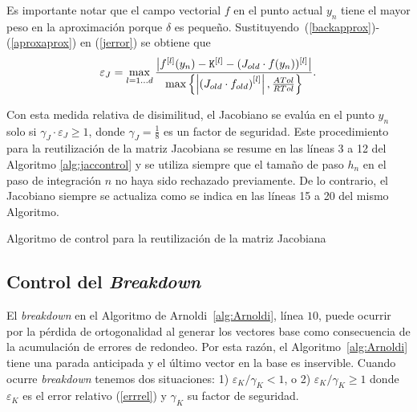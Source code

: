 Es importante notar que el campo vectorial $f$ en el punto actual $y_n$ tiene el mayor peso en la aproximación porque $\delta$
es pequeño. Sustituyendo~(\ref{backapprox})-(\ref{aproxaprox}) en (\ref{jerror}) se obtiene que
\begin{equation}\label{jerroraprox}
    \varepsilon_J = \max_{l=1\ldots d}\frac{\left\lvert f^{[l]}(y_n) - \mathtt{K}^{[l]} - (J_{old}\cdot f(y_n))^{[l]} \right\rvert}
    {\max\left\{ \left\lvert  \left(J_{old}\cdot f_{old}\right)^{[l]}  \right\rvert ,\frac{ATol}{RTol} \right\}}.
\end{equation}

Con esta medida relativa de disimilitud, el Jacobiano se evalúa en el punto $y_n$ solo si $\gamma_J \cdot \varepsilon_J \geq 1$, donde $\gamma_J=\frac{1}{8}$ es un factor de seguridad. Este procedimiento para la reutilización de la matriz Jacobiana se resume en las líneas 3 a 12 del Algoritmo \ref{alg:jaccontrol} y se utiliza siempre que el tamaño de paso $h_n$ en el paso de integración $n$ no haya sido rechazado previamente. De lo contrario, el Jacobiano siempre se actualiza como se indica en las líneas 15 a 20 del mismo Algoritmo.

{\SetAlgoNoLine
\begin{algorithm}[htb]
	\caption{Algoritmo de control para la reutilización de la matriz Jacobiana}
	\label{alg:jaccontrol}
	{
	}
\end{algorithm}
}

\subsection{Control del \textit{Breakdown}}\label{sec:brcontrol}
El \emph{breakdown} en el Algoritmo de Arnoldi~\ref{alg:Arnoldi}, línea $10$, puede ocurrir por la pérdida de ortogonalidad al generar los vectores base como consecuencia de la acumulación de errores de redondeo. Por esta razón, el Algoritmo~\ref{alg:Arnoldi} tiene una parada anticipada y el último vector en la base es inservible. Cuando ocurre \emph{breakdown} tenemos dos situaciones: 1) $\varepsilon_{K}/\gamma_K< 1$, o 2) $\varepsilon_{K}/\gamma_K \geq 1$ donde $\varepsilon_{K}$ es el error relativo (\ref{errrel}) y $\gamma_K$ su factor de seguridad.

